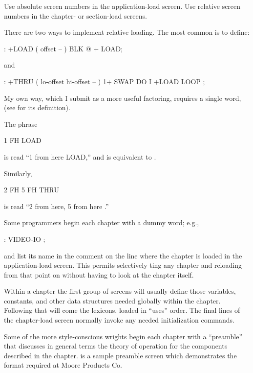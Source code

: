 \begin{tip}
Use absolute screen numbers in the application-load screen.  Use
relative screen numbers in the chapter- or section-load screens.
\end{tip}
There are two ways to implement relative loading.
The most common is to define:
\begin{Code}
: +LOAD  ( offset -- )  BLK @ +  LOAD;
\end{Code}
and
\begin{Code}
: +THRU  ( lo-offset hi-offset -- )
     1+ SWAP DO  I +LOAD  LOOP ;
\end{Code}
My own way, which I submit as a more useful factoring, requires a
single word,  (see  for its definition).

The phrase
\begin{Code}
1 FH LOAD
\end{Code}
is read ``1 from here LOAD,'' and is equivalent
to .

Similarly,
\begin{Code}
2 FH   5 FH THRU
\end{Code}
is read ``2 from here, 5 from here .''

Some programmers begin each chapter with a dummy word; e.g.,
\begin{Code}
: VIDEO-IO ;
\end{Code}
and list its name in the comment on the line where the chapter is
loaded in the application-load screen.  This permits selectively
ting any chapter and reloading from that point on
without having to look at the chapter itself.

Within a chapter the first group of screens will usually define those
variables, constants, and other data structures needed globally within
the chapter.  Following that will come the lexicons, loaded in
``uses'' order.  The final lines of the chapter-load screen normally
invoke any needed initialization commands.

Some of the more style-conscious \Forth{}wrights begin each chapter
with a ``preamble'' that discusses in general terms the theory of
operation for the components described in the chapter.  
is a sample preamble screen which demonstrates the format required at
Moore Products Co.

